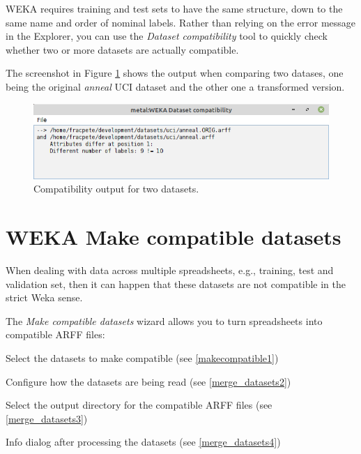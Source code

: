 WEKA requires training and test sets to have the same structure, down to the
same name and order of nominal labels. Rather than relying on the error message
in the Explorer, you can use the \textit{Dataset compatibility} tool to 
quickly check whether two or more datasets are actually compatible.

The screenshot in Figure \ref{dataset-compatibility} shows the output when
comparing two datases, one being the original \textit{anneal} UCI dataset
and the other one a transformed version.

\begin{figure}[htb]
  \centering
  \includegraphics[width=12.0cm]{images/dataset-compatibility.png}
  \caption{Compatibility output for two datasets.}
  \label{dataset-compatibility}
\end{figure}

\clearpage
\section{WEKA Make compatible datasets}
When dealing with data across multiple spreadsheets, e.g., training, test
and validation set, then it can happen that these datasets are not compatible
in the strict Weka sense.

The \textit{Make compatible datasets} wizard allows you to turn spreadsheets
into compatible ARFF files:
\begin{tight_itemize}
  \item Select the datasets to make compatible (see \ref{makecompatible1})
  \item Configure how the datasets are being read (see \ref{merge_datasets2})
  \item Select the output directory for the compatible ARFF files (see \ref{merge_datasets3})
  \item Info dialog after processing the datasets (see \ref{merge_datasets4})
\end{tight_itemize}

